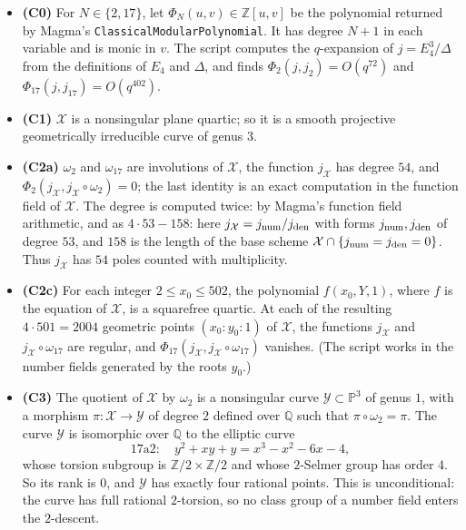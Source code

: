 \documentclass[11pt]{article}
\newcommand{\Q}{\mathbb Q}
\newcommand{\Z}{\mathbb Z}
\begin{document}
\begin{itemize}
\item \textbf{(C0)} For \(N\in\{2,17\}\), let \(\Phi_N(u,v)\in\Z[u,v]\) be the polynomial
returned by Magma's \texttt{ClassicalModularPolynomial}. It has degree \(N+1\) in each variable
and is monic in \(v\). The script computes the \(q\)-expansion of \(j=E_4^3/\Delta\) from the
definitions of \(E_4\) and \(\Delta\), and finds \(\Phi_2(j,j_2)=O(q^{72})\) and
\(\Phi_{17}(j,j_{17})=O(q^{402})\).
\item \textbf{(C1)} \(\mathcal X\) is a nonsingular plane quartic; so it is a smooth projective
geometrically irreducible curve of genus \(3\).
\item \textbf{(C2a)} \(\omega_2\) and \(\omega_{17}\) are involutions of \(\mathcal X\), the
function \(j_{\mathcal X}\) has degree \(54\), and
\(\Phi_2(j_{\mathcal X},j_{\mathcal X}\circ\omega_2)=0\); the last identity is an exact
computation in the function field of \(\mathcal X\). The degree is computed twice: by Magma's
function field arithmetic, and as \(4\cdot53-158\): here \(j_{\mathcal X}=j_{\rm num}/j_{\rm den}\)
with forms \(j_{\rm num},j_{\rm den}\) of degree \(53\), and \(158\) is the length of the base scheme
\(\mathcal X\cap\{j_{\rm num}=j_{\rm den}=0\}\). Thus \(j_{\mathcal X}\) has \(54\) poles counted with multiplicity.
\item \textbf{(C2c)} For each integer \(2\le x_0\le502\), the polynomial \(f(x_0,Y,1)\), where
\(f\) is the equation of \(\mathcal X\), is a squarefree quartic. At each of the resulting
\(4\cdot501=2004\) geometric points \((x_0:y_0:1)\) of \(\mathcal X\), the functions
\(j_{\mathcal X}\) and \(j_{\mathcal X}\circ\omega_{17}\) are regular, and
\(\Phi_{17}(j_{\mathcal X},j_{\mathcal X}\circ\omega_{17})\) vanishes. (The script works in the
number fields generated by the roots \(y_0\).)
\item \textbf{(C3)} The quotient of \(\mathcal X\) by \(\omega_2\) is a nonsingular curve
\(\mathcal Y\subset\mathbb P^3\) of genus \(1\), with a morphism \(\pi:\mathcal X\to\mathcal Y\)
of degree \(2\) defined over \(\Q\) such that \(\pi\circ\omega_2=\pi\). The curve \(\mathcal Y\)
is isomorphic over \(\Q\) to the elliptic curve
\[\text{17a2}:\quad y^2+xy+y=x^3-x^2-6x-4,\]
whose torsion subgroup is \(\Z/2\times\Z/2\) and whose \(2\)-Selmer group has order \(4\). So
its rank is \(0\), and \(\mathcal Y\) has exactly four rational points. This is unconditional:
the curve has full rational \(2\)-torsion, so no class group of a number field enters the
\(2\)-descent.

\end{itemize}
\end{document}
